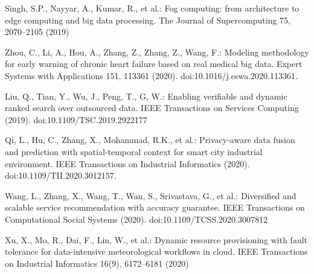 \documentclass{bmcart}
\begin{document}
\begin{backmatter}


\begin{thebibliography}{99}
Singh, S.P., Nayyar, A., Kumar, R., et al.: Fog computing: from architecture to edge computing and big data processing. The Journal of Supercomputing 75, 2070–2105 (2019) 

Zhou, C., Li, A., Hou, A., Zhang, Z., Zhang, Z., Wang, F.: Modeling methodology for early warning of chronic heart failure based on real medical big data. Expert Systems with Applications 151, 113361 (2020). doi:10.1016/j.eswa.2020.113361. 

Liu, Q., Tian, Y., Wu, J., Peng, T., G, W.: Enabling verifiable and dynamic ranked search over outsourced data. IEEE Transactions on Services Computing (2019). doi:10.1109/TSC.2019.2922177 

Qi, L., Hu, C., Zhang, X., Mohammad, R.K., et al.: Privacy-aware data fusion and prediction with spatial-temporal context for smart city industrial environment. IEEE Transactions on Industrial Informatics (2020). doi:10.1109/TII.2020.3012157. 

Wang, L., Zhang, X., Wang, T., Wan, S., Srivastava, G., et al.: Diversified and scalable service recommendation with accuracy guarantee. IEEE Transactions on Computational Social Systems (2020). doi:10.1109/TCSS.2020.3007812

Xu, X., Mo, R., Dai, F., Lin, W., et al.: Dynamic resource provisioning with fault tolerance for data-intensive meteorological workflows in cloud. IEEE Transactions on Industrial Informatics 16(9), 6172–6181 (2020)


\end{thebibliography}
\end{backmatter}
\end{document}
